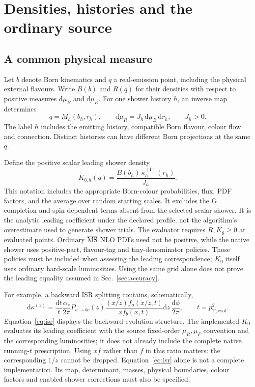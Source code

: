 \documentclass[11pt,a4paper]{article}
\newcommand{\dd}{\mathrm{d}}
\newcommand{\as}{\alpha_s}
\begin{document}
\section{Densities, histories and the ordinary source}
\label{sec:source}

\subsection{A common physical measure}
Let $b$ denote Born kinematics and $q$ a real-emission point, including
the physical external flavours. Write $B(b)$ and $R(q)$ for their
densities with respect to positive measures $\dd\mu_B$ and $\dd\mu_R$.
For one shower history $h$, an inverse map determines
\begin{equation}
 q=M_h(b_h,r_h),\qquad
 \dd\mu_R=J_h\,\dd\mu_B\,\dd r_h,\qquad J_h>0 .
 \label{eq:measure}
\end{equation}
The label $h$ includes the emitting history, compatible Born flavour,
colour flow and connection. Distinct histories can have different Born
projections at the same $q$.

Define the positive scalar leading shower density
\begin{equation}
 K_{0,h}(q)=\frac{B(b_h)\,\kappa_h^{(1)}(r_h)}{J_h}.
 \label{eq:k0}
\end{equation}
This notation includes the appropriate Born-colour probabilities, flux,
PDF factors, and the average over random starting scales. It excludes
the G completion and spin-dependent terms absent from the selected scalar
shower. It is the analytic leading coefficient under the declared
profile, not the algorithm's overestimate used to generate shower trials.
The evaluator requires $R,K_g\ge0$ at evaluated points. Ordinary
$\overline{\rm MS}$ NLO PDFs need not be positive, while the native
shower uses positive-part, flavour-tag and tiny-denominator policies.
Those policies must be included when assessing the leading
correspondence; $K_0$ itself uses ordinary hard-scale luminosities.
Using the same grid alone does not prove the leading equality assumed
in Sec.~\ref{sec:accuracy}.

For example, a backward ISR splitting contains, schematically,
\begin{equation}
 \dd\kappa^{(1)}=
 \frac{\dd t}{t}\frac{\as}{2\pi}P_{a\to bc}(z)
 \frac{(x/z)f_a(x/z,t)}{xf_b(x,t)}
 \dd z\,\frac{\dd\phi}{2\pi},\qquad t=p_{\mathrm T,\mathrm{evol}}^2.
 \label{eq:isr}
\end{equation}
Equation~\eqref{eq:isr} displays the backward-evolution structure.
The implemented $K_0$ evaluates its leading coefficient with the
source fixed-order $\mu_R,\mu_F$ convention and the corresponding
luminosities; it does not already include the complete native
running-$t$ prescription. Using $xf$ rather than $f$ in this ratio matters: the corresponding
$1/z$ cannot be dropped. Equation~\eqref{eq:isr} alone is not a complete
implementation. Its map, determinant, masses, physical boundaries,
colour factors and enabled shower corrections must also be specified.
\end{document}
